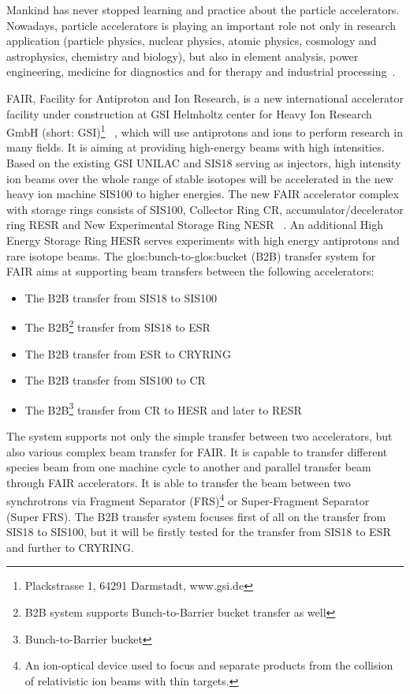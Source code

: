 Mankind has never stopped learning and practice about the particle accelerators. Nowadays, particle accelerators is playing an important role not only in research application (particle physics, nuclear physics, atomic physics, cosmology and astrophysics, chemistry and biology), but also in element analysis, power engineering, medicine for diagnostics and for therapy and industrial processing~\cite{barbalat_applications_1994}. 


FAIR, Facility for Antiproton and Ion Research, is a new international accelerator facility under construction at GSI Helmholtz center for Heavy Ion Research GmbH (short: GSI)\footnote{Plackstrasse 1, 64291 Darmstadt, www.gsi.de} ~\cite{eschke_international_2005, _fair_2011}, which will use antiprotons and ions to perform research in many fields. It is aiming at providing high-energy beams with high intensities. Based on the existing GSI \gls{UNILAC} and SIS18 serving as injectors, high intensity ion beams over the whole range of stable isotopes will be accelerated in the new heavy ion machine SIS100 to higher energies. The new FAIR accelerator complex with storage rings consists of SIS100, Collector Ring CR, accumulator/decelerator ring RESR and New Experimental Storage Ring NESR ~\cite{spiller_fair_2006}. An additional High Energy Storage Ring HESR serves experiments with high energy antiprotons and rare isotope beams. The \gls{glos:bunch}-to-\gls{glos:bucket} (\gls{B2B}) transfer system for FAIR aims at supporting beam transfers between the following accelerators:
\begin{itemize}
\item The B2B transfer from \gls{SIS18} to \gls{SIS100}
\item The B2B\footnote{B2B system supports Bunch-to-Barrier bucket transfer as well} transfer from SIS18 to \gls{ESR}
\item The B2B transfer from ESR to CRYRING
\item The B2B transfer from SIS100 to \gls{CR}
\item The B2B\footnote{Bunch-to-Barrier bucket} transfer from CR to \gls{HESR} and later to \gls{RESR}
\end{itemize}

The system supports not only the simple transfer between two accelerators, but also various complex beam transfer for FAIR. It is capable to transfer different species beam from one machine cycle to another and parallel transfer beam through FAIR accelerators. It is able to transfer the beam between two synchrotrons via Fragment Separator (\gls{FRS})\footnote{An ion-optical device used to focus and separate products from the collision of relativistic ion beams with thin targets.} or Super-Fragment Separator (Super FRS). The B2B transfer system focuses first of all on the transfer from SIS18 to SIS100, but it will be firstly tested for the transfer from SIS18 to ESR and further to CRYRING.  

